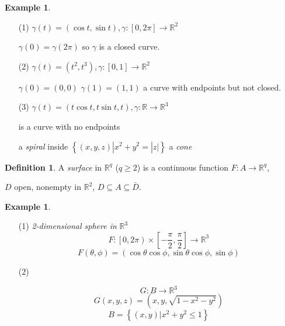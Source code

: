 \documentclass[12pt]{amsbook}
\theoremstyle{definition}
\newtheorem{definition}[theorem]{Definition}
\newtheorem{example}[theorem]{Example}
\newcommand{\RR}{{\mathbb R}}
\newcommand{\ra}{\rightarrow} %
\begin{document}
\begin{example}
\begin{itemize}
\item[(1)] $\gamma(t) = \left(\cos t, \sin t\right), \gamma: [0, 2\pi] \ra \RR^2$

$\gamma(0) = \gamma(2\pi)$ so $\gamma$ is a closed curve.


\item[(2)] $\gamma(t) = \left(t^2, t^3 \right), \gamma: [0, 1] \ra \RR^2$

$\gamma(0) = (0,0)$  $\gamma(1) = (1,1)$ a curve with endpoints but not closed.


\item[(3)] $\gamma(t) = \left(t \cos t, t \sin t, t \right), \gamma: \RR \ra \RR^3$

is a curve with no endpoints

a \emph{spiral} inside $\left\{(x,y,z) | x^2 + y^2 = |z|\right\}$ a \emph{cone}

\end{itemize}
\end{example}


\begin{definition} A \emph{surface} in $\RR^q$ ($q \geq 2$) is a continuous function $F : A \ra \RR^q$, 

$D$ open, nonempty in $\RR^2$, $D \subseteq A \subseteq \bar D$.
\end{definition}

\begin{example}
\begin{itemize}
\item[(1)] \emph{2-dimensional sphere in} $\RR^3$
\begin{equation*}F : \left[0, 2\pi\right) \times \left[-\frac{\pi}{2}, \frac{\pi}{2}\right] \ra \RR^3 \end{equation*}
\begin{equation*}F(\theta, \phi) = (\cos \theta \cos \phi, \sin \theta \cos \phi, \sin \phi) \end{equation*}



\item[(2)]

\begin{equation*}G : B \ra \RR^3 \end{equation*}
\begin{equation*}G(x,y,z) = \left(x, y, \sqrt{1-x^2-y^2}\right) \end{equation*}
\begin{equation*}B = \left\{ (x, y) | x^2+y^2 \leq 1 \right\} \end{equation*}


\end{itemize}
\end{example}
\end{document}
